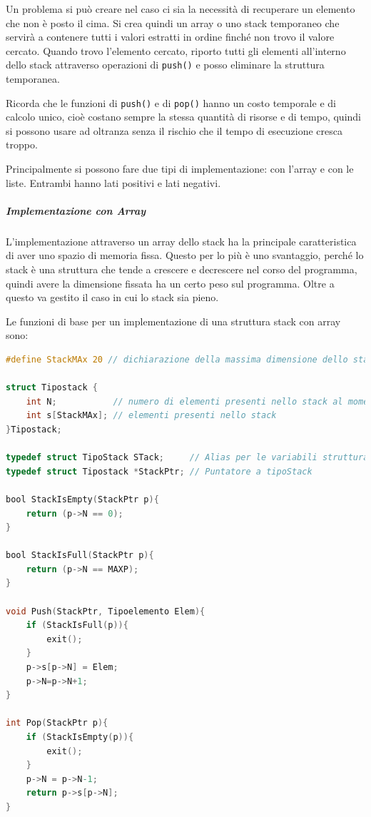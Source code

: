 \documentclass[
  paper=a4,
  oneside  ,captions=tableheading
]{scrbook}
\newcommand{\passthrough}[1]{#1}
\begin{document}
Un problema si può creare nel caso ci sia la necessità di recuperare un
elemento che non è posto il cima. Si crea quindi un array o uno stack
temporaneo che servirà a contenere tutti i valori estratti in ordine
finché non trovo il valore cercato. Quando trovo l'elemento cercato,
riporto tutti gli elementi all'interno dello stack attraverso operazioni
di \passthrough{\lstinline!push()!} e posso eliminare la struttura
temporanea.

Ricorda che le funzioni di \passthrough{\lstinline!push()!} e di
\passthrough{\lstinline!pop()!} hanno un costo temporale e di calcolo
unico, cioè costano sempre la stessa quantità di risorse e di tempo,
quindi si possono usare ad oltranza senza il rischio che il tempo di
esecuzione cresca troppo.

Principalmente si possono fare due tipi di implementazione: con l'array
e con le liste. Entrambi hanno lati positivi e lati negativi.

\hypertarget{implementazione-con-array}{%
\subparagraph{\texorpdfstring{Implementazione con
\emph{Array}}{Implementazione con Array}}\label{implementazione-con-array}}

L'implementazione attraverso un array dello stack ha la principale
caratteristica di aver uno spazio di memoria fissa. Questo per lo più è
uno svantaggio, perché lo stack è una struttura che tende a crescere e
decrescere nel corso del programma, quindi avere la dimensione fissata
ha un certo peso sul programma. Oltre a questo va gestito il caso in cui
lo stack sia pieno.

Le funzioni di base per un implementazione di una struttura stack con
array sono:

\begin{lstlisting}[language=C]
#define StackMAx 20 // dichiarazione della massima dimensione dello stack

struct Tipostack {
    int N;           // numero di elementi presenti nello stack al momento
    int s[StackMAx]; // elementi presenti nello stack
}Tipostack;

typedef struct TipoStack STack;     // Alias per le variabili strutturate
typedef struct Tipostack *StackPtr; // Puntatore a tipoStack

bool StackIsEmpty(StackPtr p){
    return (p->N == 0);
}

bool StackIsFull(StackPtr p){
    return (p->N == MAXP);
}

void Push(StackPtr, Tipoelemento Elem){
    if (StackIsFull(p)){
        exit();
    }
    p->s[p->N] = Elem;
    p->N=p->N+1;
}

int Pop(StackPtr p){
    if (StackIsEmpty(p)){
        exit();
    }
    p->N = p->N-1;
    return p->s[p->N];
}
\end{lstlisting}
\end{document}
